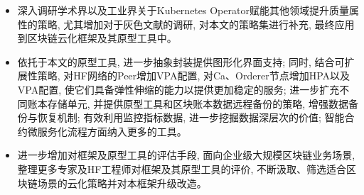 \begin{itemize}[itemindent=2em]
    \item 深入调研学术界以及工业界关于Kubernetes Operator赋能其他领域提升质量属性的策略, 尤其增加对于灰色文献的调研, 对本文的策略集进行补充, 最终应用到区块链云化框架及其原型工具中。

    \item 依托于本文的原型工具, 进一步抽象封装提供图形化界面支持; 同时, 结合可扩展性策略, 对HF网络的Peer增加VPA配置, 对Ca、Orderer节点增加HPA以及VPA配置, 使它们具备弹性伸缩的能力以提供更加稳定的服务; 进一步扩充不同账本存储单元, 并提供原型工具和区块账本数据远程备份的策略, 增强数据备份与恢复机制; 有效利用监控指标数据, 进一步挖掘数据深层次的价值; 智能合约微服务化流程方面纳入更多的工具。 

    \item 进一步增加对框架及原型工具的评估手段, 面向企业级大规模区块链业务场景, 整理更多专家及HF工程师对框架及其原型工具的评价, 不断汲取、筛选适合区块链场景的云化策略并对本框架升级改造。 

\end{itemize}
